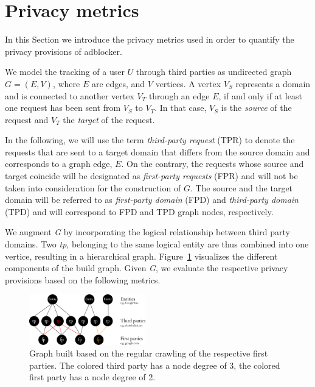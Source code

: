\documentclass{sig-alternate}
\begin{document}
\section{Privacy metrics} \label{sec:background}
In this Section we introduce the privacy metrics used in order to quantify the privacy provisions of adblocker.


We model the tracking of a user $U$ through third parties as undirected graph $G=(E,V)$, where $E$ are edges, and $V$ vertices. A vertex $V_S$ represents a domain and is connected to another vertex $V_T$ through an edge $E$, if and only if at least one request has been sent from $V_S$ to $V_T$. In that case, $V_S$ is the \textit{source} of the request and $V_T$ the \textit{target} of the request.

In the following, we will use the term \textit{third-party request} (TPR) to denote the requests that are sent to a target domain that differs from the source domain and corresponds to a graph edge, $E$. On the contrary, the requests whose source and target coincide will be designated as \textit{first-party requests} (FPR) and will not be taken into consideration for the construction of $G$. The source and the target domain will be referred to as \textit{first-party domain} (FPD) and \textit{third-party domain} (TPD) and will correspond to FPD and TPD graph nodes, respectively.

We augment \emph{G} by incorporating the logical relationship between third party domains. Two \emph{tp}, belonging to the same logical entity are thus combined into one vertice, resulting in a hierarchical graph. Figure~\ref{fig:graph} visualizes the different components of the build graph. Given \emph{G}, we evaluate the respective privacy provisions based on the following metrics.

\begin{figure}[htb!]
  \centering
  \includegraphics[width=0.45\textwidth]{figures/graph.eps}
  \caption{Graph built based on the regular crawling of the respective first parties. The colored third party has a node degree of 3, the colored first party has a node degree of 2.}\label{fig:graph}
\end{figure}
\end{document}
